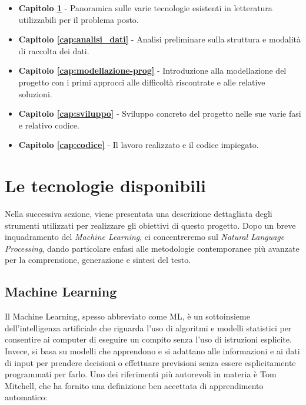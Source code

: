 \documentclass[12pt,a4paper,twoside,openright]{book}
\begin{document}
\begin{itemize}
    \item \textbf{Capitolo \ref{cap:tecnologie}} - Panoramica sulle varie tecnologie esistenti in letteratura utilizzabili per il problema posto.
    \item \textbf{Capitolo \ref{cap:analisi_dati}} - Analisi preliminare sulla struttura e modalità di raccolta dei dati.
    \item \textbf{Capitolo \ref{cap:modellazione-prog}} - Introduzione alla modellazione del progetto con i primi approcci alle difficoltà riscontrate e alle relative soluzioni.
    \item \textbf{Capitolo \ref{cap:sviluppo}} - Sviluppo concreto del progetto nelle sue varie fasi e relativo codice.
    \item \textbf{Capitolo \ref{cap:codice}} - Il lavoro realizzato e il codice impiegato.
\end{itemize}






































\chapter{Le tecnologie disponibili}
\label{cap:tecnologie}

Nella successiva sezione, viene presentata una descrizione dettagliata degli strumenti utilizzati per realizzare gli obiettivi di questo progetto. Dopo un breve inquadramento del \emph{Machine Learning}, ci concentreremo sul \emph{Natural Language Processing}, dando particolare enfasi alle metodologie contemporanee più avanzate per la comprensione, generazione e sintesi del testo.

\section{Machine Learning}
Il Machine Learning, spesso abbreviato come ML, è un sottoinsieme dell'intelligenza artificiale che riguarda l'uso di algoritmi e modelli statistici per consentire ai computer di eseguire un compito senza l'uso di istruzioni esplicite. Invece, si basa su modelli che apprendono e si adattano alle informazioni e ai dati di input per prendere decisioni o effettuare previsioni senza essere esplicitamente programmati per farlo.
Uno dei riferimenti più autorevoli in materia è Tom Mitchell, che ha fornito una definizione ben accettata di apprendimento automatico\cite{DBLP:books/daglib/0087929}:
\end{document}
